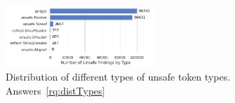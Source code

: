 \begin{figure}[!t]
    \centering
    \includegraphics[width=0.5\textwidth]{gfx/figures/distribution-unsafe-types.png}
    \caption{Distribution of different types of unsafe token types. Answers~\ref{rq:distTypes}}
    \label{fig:unsafe-tokens-distribution}
\end{figure}